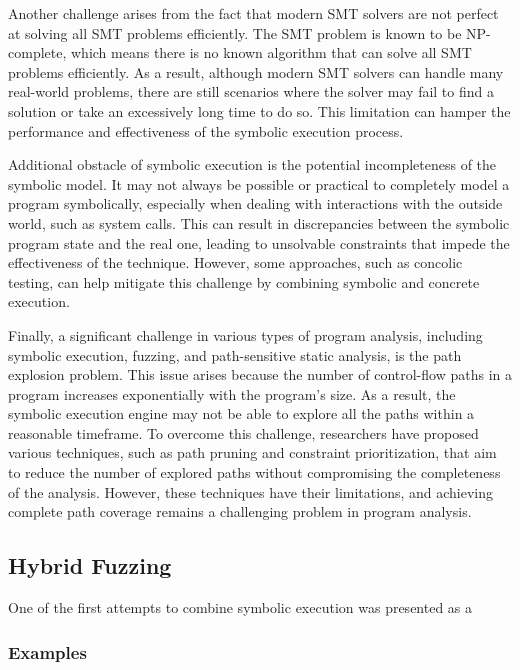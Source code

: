 
Another challenge arises from the fact that modern SMT solvers are not perfect at solving all SMT problems efficiently. The SMT problem is known to be NP-complete, which means there is no known algorithm that can solve all SMT problems efficiently. As a result, although modern SMT solvers can handle many real-world problems, there are still scenarios where the solver may fail to find a solution or take an excessively long time to do so. This limitation can hamper the performance and effectiveness of the symbolic execution process.


Additional obstacle of symbolic execution is the potential incompleteness of the symbolic model. It may not always be possible or practical to completely model a program symbolically, especially when dealing with interactions with the outside world, such as system calls. This can result in discrepancies between the symbolic program state and the real one, leading to unsolvable constraints that impede the effectiveness of the technique. However, some approaches, such as concolic testing, can help mitigate this challenge by combining symbolic and concrete execution.


Finally, a significant challenge in various types of program analysis, including symbolic execution, fuzzing, and path-sensitive static analysis, is the path explosion problem. This issue arises because the number of control-flow paths in a program increases exponentially with the program's size. As a result, the symbolic execution engine may not be able to explore all the paths within a reasonable timeframe. To overcome this challenge, researchers have proposed various techniques, such as path pruning and constraint prioritization, that aim to reduce the number of explored paths without compromising the completeness of the analysis. However, these techniques have their limitations, and achieving complete path coverage remains a challenging problem in program analysis.

\subsection{Hybrid Fuzzing}


One of the first attempts to combine symbolic execution was presented as a \cite{driller-ndss16}

\subsubsection{Examples}
